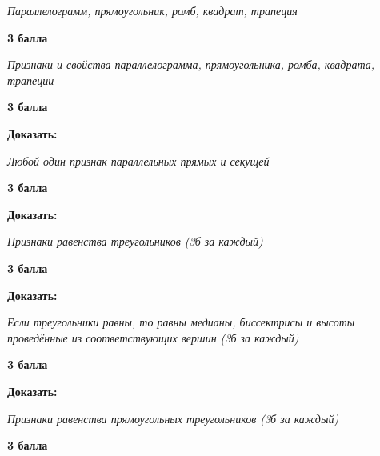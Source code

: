  \textit{Параллелограмм, прямоугольник, ромб, квадрат, трапеция}

\begin{flushright} \textbf{3 балла}\\ 
\end{flushright}


 \textit{Признаки и свойства параллелограмма, прямоугольника, ромба, квадрата, трапеции}

\begin{flushright} \textbf{3 балла}\\ 
\end{flushright}


\newpage
\hspace{3mm}



 \textbf{Доказать:} 

\textit{Любой один признак параллельных прямых и секущей}

\begin{flushright} \textbf{3 балла}\\ 
\end{flushright}

 \textbf{Доказать:} 

\textit{Признаки равенства треугольников (3б за каждый)}

\begin{flushright} \textbf{3 балла}\\ 
\end{flushright}



 \textbf{Доказать:}

\textit{Если треугольники равны, то равны медианы, биссектрисы и высоты проведённые из соответствующих вершин (3б за каждый)}

\begin{flushright} \textbf{3 балла}\\ 
\end{flushright}



 \textbf{Доказать:}

\textit{Признаки равенства прямоугольных треугольников (3б за каждый)}

\begin{flushright} \textbf{3 балла}\\ 
\end{flushright}


